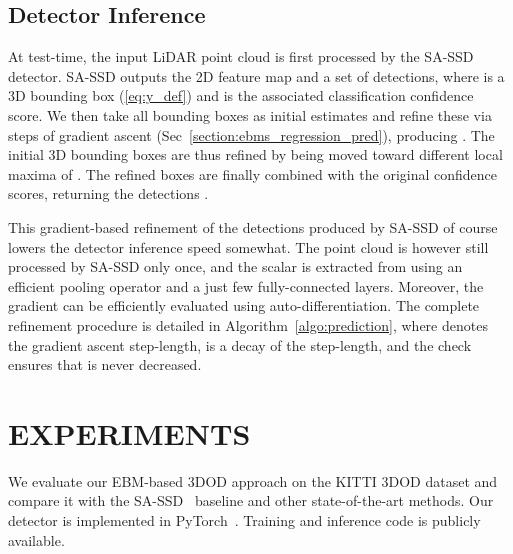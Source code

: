 \documentclass[letterpaper, 10 pt, conference]{ieeeconf}
\begin{document}
\subsection{Detector Inference}
\label{section:method_prediction}
At test-time, the input LiDAR point cloud  is first processed by the SA-SSD detector. SA-SSD outputs the 2D feature map  and a set  of  detections, where  is a 3D bounding box (\ref{eq:y_def}) and  is the associated classification confidence score. We then take all bounding boxes  as initial estimates and refine these via  steps of gradient ascent (Sec~\ref{section:ebms_regression_pred}), producing . The initial 3D bounding boxes  are thus refined by being moved toward different local maxima of . The refined boxes  are finally combined with the original confidence scores, returning the detections .

This gradient-based refinement of the detections produced by SA-SSD of course lowers the detector inference speed somewhat. The point cloud  is however still processed by SA-SSD only once, and the scalar  is extracted from  using an efficient pooling operator and a just few fully-connected layers. Moreover, the gradient  can be efficiently evaluated using auto-differentiation. The complete refinement procedure is detailed in Algorithm~\ref{algo:prediction}, where  denotes the gradient ascent step-length,  is a decay of the step-length, and the  check ensures that  is never decreased.










 \section{EXPERIMENTS}
\label{section:experiments}

We evaluate our EBM-based 3DOD approach on the KITTI 3DOD dataset \cite{geiger2012we} and compare it with the SA-SSD~\cite{he2020structure} baseline and other state-of-the-art methods. Our detector is implemented in PyTorch~\cite{paszke2019pytorch}. Training and inference code is publicly available.
\end{document}
